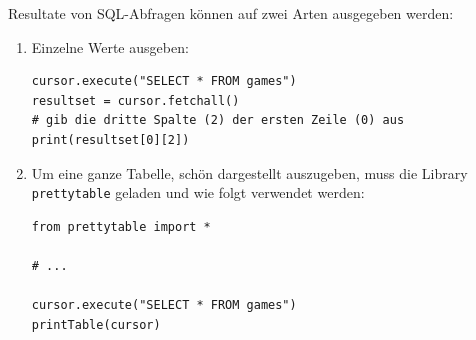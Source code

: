 \begin{myexample}
Resultate von SQL-Abfragen können auf zwei Arten ausgegeben werden:
\begin{enumerate}
\item Einzelne Werte ausgeben:
\begin{lstlisting}[style=Python]
cursor.execute("SELECT * FROM games")
resultset = cursor.fetchall()
# gib die dritte Spalte (2) der ersten Zeile (0) aus
print(resultset[0][2]) 
\end{lstlisting}

\item Um eine ganze Tabelle, schön dargestellt auszugeben, muss die Library \lstinline|prettytable| geladen und wie folgt verwendet werden:
\begin{lstlisting}[style=Python]
from prettytable import *

# ... 

cursor.execute("SELECT * FROM games")
printTable(cursor)
\end{lstlisting}
\end{enumerate}
\end{myexample}

